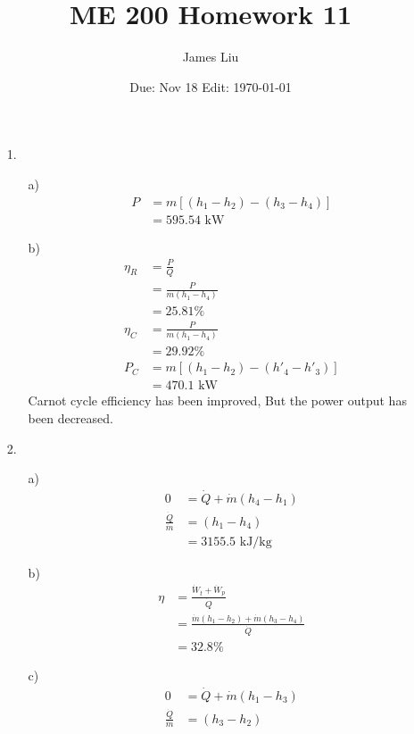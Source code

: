 \documentclass{article}
\date{Due: Nov 18 Edit: \today}
\title{ME 200 Homework 11}
\author{James Liu}
\begin{document}
\maketitle
\begin{itemize}
    \item [1.] 
    \begin{itemize}
        \item [a)]
        \begin{align*}
            P&=m[(h_1-h_2)-(h_3-h_4)]\\
            &=595.54 \text{ kW}
        \end{align*}
        \item [b)]
        \begin{align*}
            \eta_R &= \frac{P}{Q}\\
            &=\frac{P}{m(h_1-h_4)}\\
            &=25.81\%\\
            \eta_C &= \frac{P}{m(h_1-h_4)}\\
            &=29.92\%\\
            P_C &=m[(h_1-h_2)-(h'_4-h'_3)]\\
            &=470.1 \text{ kW}
        \end{align*}
        Carnot cycle efficiency has been improved, But the power output has been decreased.
    \end{itemize}
    \item [2.]
    \begin{itemize}
        \item [a)]
        \begin{align*}
            0&=\dot Q+\dot m(h_4-h_1)\\
            \frac{\dot Q}{\dot m}&=(h_1-h_4)\\
            &=3155.5 \text{ kJ/kg}
        \end{align*}
        \item [b)]
        \begin{align*}
            \eta &= \frac{\dot W_t+\dot W_p}{\dot Q}\\
            &=\frac{\dot m(h_1-h_2)+\dot m(h_3-h_4)}{\dot Q}\\
            &=32.8\%
        \end{align*}
        \item [c)]
        \begin{align*}
            0&=\dot Q+\dot m(h_1-h_3)\\
            \frac{\dot Q}{\dot m}&=(h_3-h_2)\\

\end{align*}
\end{itemize}
\end{itemize}
\end{document}
